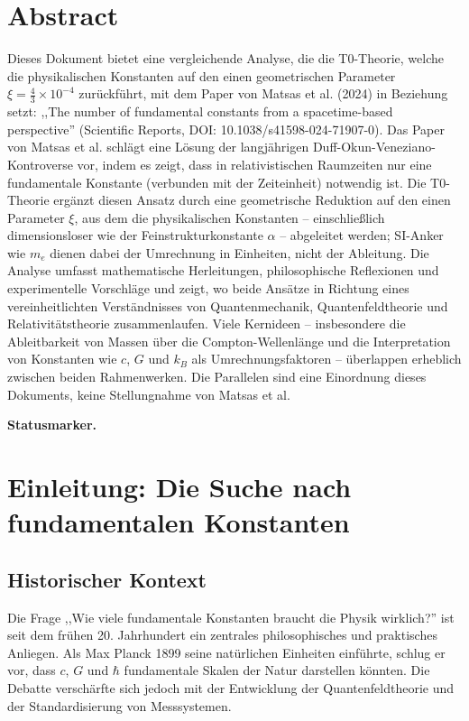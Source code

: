 \section*{Abstract}
		Dieses Dokument bietet eine vergleichende Analyse, die die T0-Theorie, welche die physikalischen Konstanten auf den einen geometrischen Parameter $\xi = \frac{4}{3} \times 10^{-4}$ zurückführt, mit dem Paper von Matsas et al. (2024) in Beziehung setzt: ,,The number of fundamental constants from a spacetime-based perspective'' (Scientific Reports, DOI: 10.1038/s41598-024-71907-0). Das Paper von Matsas et al. schlägt eine Lösung der langjährigen Duff-Okun-Veneziano-Kontroverse vor, indem es zeigt, dass in relativistischen Raumzeiten nur eine fundamentale Konstante (verbunden mit der Zeiteinheit) notwendig ist. Die T0-Theorie ergänzt diesen Ansatz durch eine geometrische Reduktion auf den einen Parameter $\xi$, aus dem die physikalischen Konstanten -- einschließlich dimensionsloser wie der Feinstrukturkonstante $\alpha$ -- abgeleitet werden; SI-Anker wie $m_e$ dienen dabei der Umrechnung in Einheiten, nicht der Ableitung. Die Analyse umfasst mathematische Herleitungen, philosophische Reflexionen und experimentelle Vorschläge und zeigt, wo beide Ansätze in Richtung eines vereinheitlichten Verständnisses von Quantenmechanik, Quantenfeldtheorie und Relativitätstheorie zusammenlaufen. Viele Kernideen -- insbesondere die Ableitbarkeit von Massen über die Compton-Wellenlänge und die Interpretation von Konstanten wie $c$, $G$ und $k_B$ als Umrechnungsfaktoren -- überlappen erheblich zwischen beiden Rahmenwerken. Die Parallelen sind eine Einordnung dieses Dokuments, keine Stellungnahme von Matsas et al.

\medskip\noindent\textbf{Statusmarker.}


	
	
	
	
	\section{Einleitung: Die Suche nach fundamentalen Konstanten}
	
	\subsection{Historischer Kontext}
	
	Die Frage ,,Wie viele fundamentale Konstanten braucht die Physik wirklich?'' ist seit dem frühen 20. Jahrhundert ein zentrales philosophisches und praktisches Anliegen. Als Max Planck 1899 seine natürlichen Einheiten einführte, schlug er vor, dass $c$, $G$ und $\hbar$ fundamentale Skalen der Natur darstellen könnten. Die Debatte verschärfte sich jedoch mit der Entwicklung der Quantenfeldtheorie und der Standardisierung von Messsystemen.
	
